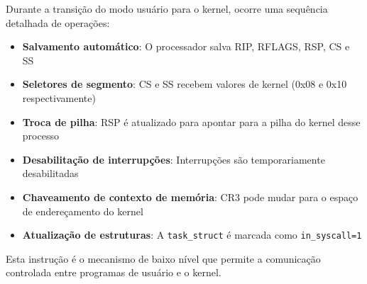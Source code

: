 \documentclass[10pt,a4paper]{article}
\begin{document}
Durante a transição do modo usuário para o kernel, ocorre uma sequência detalhada de operações:
\vspace{-0.2cm}
\begin{itemize}\setlength\itemsep{0pt}
  \item \textbf{Salvamento automático}: O processador salva RIP, RFLAGS, RSP, CS e SS
  \item \textbf{Seletores de segmento}: CS e SS recebem valores de kernel (0x08 e 0x10 respectivamente)
  \item \textbf{Troca de pilha}: RSP é atualizado para apontar para a pilha do kernel desse processo
  \item \textbf{Desabilitação de interrupções}: Interrupções são temporariamente desabilitadas
  \item \textbf{Chaveamento de contexto de memória}: CR3 pode mudar para o espaço de endereçamento do kernel
  \item \textbf{Atualização de estruturas}: A \texttt{task\_struct} é marcada como \texttt{in\_syscall=1}
\end{itemize}
\vspace{-0.2cm}

Esta instrução é o mecanismo de baixo nível que permite a comunicação controlada entre programas de usuário e o kernel.
\end{document}
